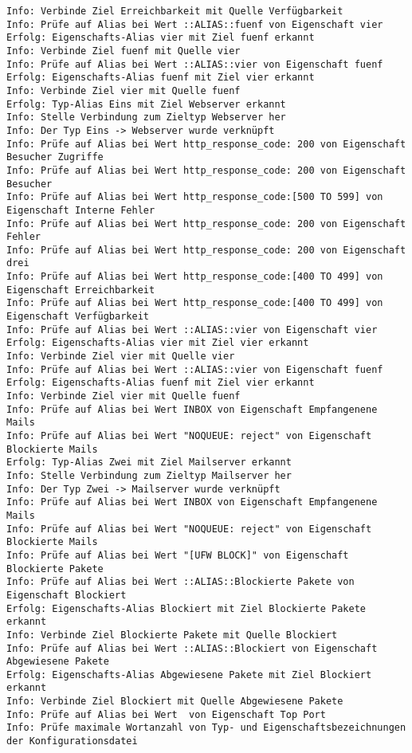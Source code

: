 \begin{lstlisting}[caption={Konsolenausgabe beim Start des Programms}, label=log-start, xleftmargin=6mm]
Info: Verbinde Ziel Erreichbarkeit mit Quelle Verfügbarkeit 
Info: Prüfe auf Alias bei Wert ::ALIAS::fuenf von Eigenschaft vier 
Erfolg: Eigenschafts-Alias vier mit Ziel fuenf erkannt 
Info: Verbinde Ziel fuenf mit Quelle vier 
Info: Prüfe auf Alias bei Wert ::ALIAS::vier von Eigenschaft fuenf 
Erfolg: Eigenschafts-Alias fuenf mit Ziel vier erkannt 
Info: Verbinde Ziel vier mit Quelle fuenf 
Erfolg: Typ-Alias Eins mit Ziel Webserver erkannt 
Info: Stelle Verbindung zum Zieltyp Webserver her 
Info: Der Typ Eins -> Webserver wurde verknüpft 
Info: Prüfe auf Alias bei Wert http_response_code: 200 von Eigenschaft Besucher Zugriffe 
Info: Prüfe auf Alias bei Wert http_response_code: 200 von Eigenschaft Besucher 
Info: Prüfe auf Alias bei Wert http_response_code:[500 TO 599] von Eigenschaft Interne Fehler 
Info: Prüfe auf Alias bei Wert http_response_code: 200 von Eigenschaft Fehler 
Info: Prüfe auf Alias bei Wert http_response_code: 200 von Eigenschaft drei 
Info: Prüfe auf Alias bei Wert http_response_code:[400 TO 499] von Eigenschaft Erreichbarkeit 
Info: Prüfe auf Alias bei Wert http_response_code:[400 TO 499] von Eigenschaft Verfügbarkeit 
Info: Prüfe auf Alias bei Wert ::ALIAS::vier von Eigenschaft vier 
Erfolg: Eigenschafts-Alias vier mit Ziel vier erkannt 
Info: Verbinde Ziel vier mit Quelle vier 
Info: Prüfe auf Alias bei Wert ::ALIAS::vier von Eigenschaft fuenf 
Erfolg: Eigenschafts-Alias fuenf mit Ziel vier erkannt 
Info: Verbinde Ziel vier mit Quelle fuenf 
Info: Prüfe auf Alias bei Wert INBOX von Eigenschaft Empfangenene Mails 
Info: Prüfe auf Alias bei Wert "NOQUEUE: reject" von Eigenschaft Blockierte Mails 
Erfolg: Typ-Alias Zwei mit Ziel Mailserver erkannt 
Info: Stelle Verbindung zum Zieltyp Mailserver her 
Info: Der Typ Zwei -> Mailserver wurde verknüpft 
Info: Prüfe auf Alias bei Wert INBOX von Eigenschaft Empfangenene Mails 
Info: Prüfe auf Alias bei Wert "NOQUEUE: reject" von Eigenschaft Blockierte Mails 
Info: Prüfe auf Alias bei Wert "[UFW BLOCK]" von Eigenschaft Blockierte Pakete 
Info: Prüfe auf Alias bei Wert ::ALIAS::Blockierte Pakete von Eigenschaft Blockiert 
Erfolg: Eigenschafts-Alias Blockiert mit Ziel Blockierte Pakete erkannt 
Info: Verbinde Ziel Blockierte Pakete mit Quelle Blockiert 
Info: Prüfe auf Alias bei Wert ::ALIAS::Blockiert von Eigenschaft Abgewiesene Pakete 
Erfolg: Eigenschafts-Alias Abgewiesene Pakete mit Ziel Blockiert erkannt 
Info: Verbinde Ziel Blockiert mit Quelle Abgewiesene Pakete 
Info: Prüfe auf Alias bei Wert  von Eigenschaft Top Port 
Info: Prüfe maximale Wortanzahl von Typ- und Eigenschaftsbezeichnungen der Konfigurationsdatei 

\end{lstlisting}
